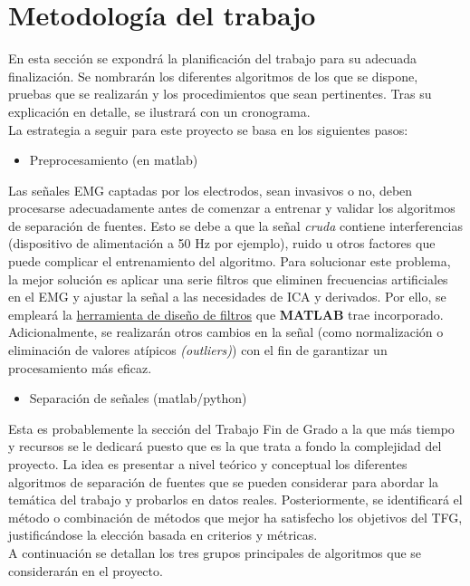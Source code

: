 \documentclass[12pt, a4paper]{article}
\let\chapter\section
\begin{document}
\chapter{Metodología del trabajo}
En esta sección se expondrá la planificación del trabajo para su adecuada finalización. Se nombrarán los diferentes algoritmos de los que se dispone, pruebas que se realizarán y los procedimientos que sean pertinentes. Tras su explicación en detalle, se ilustrará con un cronograma.
\\La estrategia a seguir para este proyecto se basa en los siguientes pasos:
\begin{itemize}
    \item Preprocesamiento (en matlab)
\end{itemize}
\noindent Las señales EMG captadas por los electrodos, sean invasivos o no, deben procesarse adecuadamente antes de comenzar a entrenar y validar los algoritmos de separación de fuentes. Esto se debe a que la señal \textit{cruda} contiene interferencias (dispositivo de alimentación a 50 Hz por ejemplo), ruido u otros factores que puede complicar el entrenamiento del algoritmo. Para solucionar este problema, la mejor solución es aplicar una serie filtros que eliminen frecuencias artificiales en el EMG y ajustar la señal a las necesidades de ICA y derivados. Por ello, se empleará la \href{https://www.mathworks.com/help/signal/ug/introduction-to-filter-designer.htm}{herramienta de diseño de filtros} que \textbf{MATLAB} trae incorporado. Adicionalmente, se realizarán otros cambios en la señal (como normalización o eliminación de valores atípicos \textit{(outliers)}) con el fin de garantizar un procesamiento más eficaz.
\begin{itemize}
    \item Separación de señales (matlab/python)
\end{itemize}
Esta es probablemente la sección del Trabajo Fin de Grado a la que más tiempo y recursos se le dedicará puesto que es la que trata a fondo la complejidad del proyecto. La idea es presentar a nivel teórico y conceptual los diferentes algoritmos de separación de fuentes que se pueden considerar para abordar la temática del trabajo y probarlos en datos reales. Posteriormente, se identificará el método o combinación de métodos que mejor ha satisfecho los objetivos del TFG, justificándose la elección basada en criterios y métricas. \\ 
A continuación se detallan los tres grupos principales de algoritmos que se considerarán en el proyecto.
\end{document}
